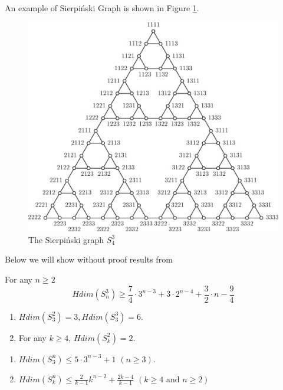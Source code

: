 \documentclass[12pt,a4paper,titlepage,openany]{report}
\begin{document}
An example of Sierpi\'nski Graph is shown in Figure \ref{fig:spierpinski}.
\begin{figure}[h]
\begin{center}
\includegraphics[width=1\linewidth]{figures/sierpinski.png}
\end{center}
\caption{The Sierpi\'nski graph $S^3_4$}\label{fig:spierpinski}
\end{figure}
Below we will show without proof results from \cite{Sandi}

\begin{theorem}
For any $n\geq 2$
$$Hdim( S^3_n)\geq \frac{7}{4}\cdot 3^{n-3}+3\cdot 2^{n-4}+\frac{3}{2}\cdot n-\frac{9}{4}$$
\end{theorem}

\begin{proposition}
\begin{enumerate}[label=(\roman*)]
\item $Hdim(S_3^2)=3,Hdim(S_3^3)=6$.
\item For any $k\geq 4$, $Hdim(S_k^2)=2$. 
\end{enumerate}
\end{proposition}

\begin{theorem}
\begin{enumerate}[label=(\roman*)]
\item $Hdim(S_3^n)\leq 5\cdot 3^{n-3}+1$ $(n\geq 3)$.
\item $Hdim(S_k^n)\leq \frac{2}{k-1}k^{n-2}+\frac{2k-4}{k-1}$ $(k\geq 4 \text{ and } n\geq 2)$ 
\end{enumerate}
\end{theorem}
\end{document}
